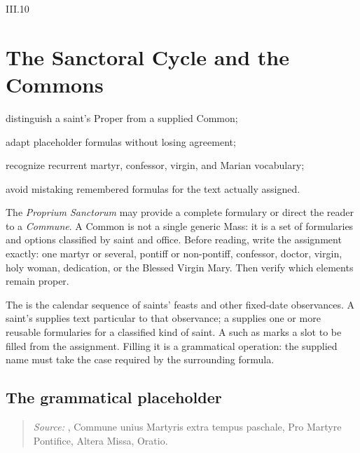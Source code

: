 \begin{courseunit}{III.10}
\chapter{The Sanctoral Cycle and the Commons}

\begin{learningobjectives}
  \item distinguish a saint's Proper from a supplied Common;
  \item adapt placeholder formulas without losing agreement;
  \item recognize recurrent martyr, confessor, virgin, and Marian vocabulary;
  \item avoid mistaking remembered formulas for the text actually assigned.
\end{learningobjectives}

The \emph{Proprium Sanctorum} may provide a complete formulary or direct the
reader to a \emph{Commune}. A Common is not a single generic Mass: it is a set
of formularies and options classified by saint and office. Before reading, write
the assignment exactly: one martyr or several, pontiff or non-pontiff,
confessor, doctor, virgin, holy woman, dedication, or the Blessed Virgin Mary.
Then verify which elements remain proper.

The  is the calendar sequence of saints' feasts and other
fixed-date observances. A saint's  supplies text particular to
that observance; a  supplies one or more reusable formularies for
a classified kind of saint. A  such as  marks a
slot to be filled from the assignment. Filling it is a grammatical operation:
the supplied name must take the case required by the surrounding formula.

\section{The grammatical placeholder}

\begin{quote}

\emph{Source:} \Missal, Commune unius Martyris extra tempus paschale, Pro
Martyre Pontifice, Altera Missa, Oratio.
\end{quote}


\end{courseunit}
